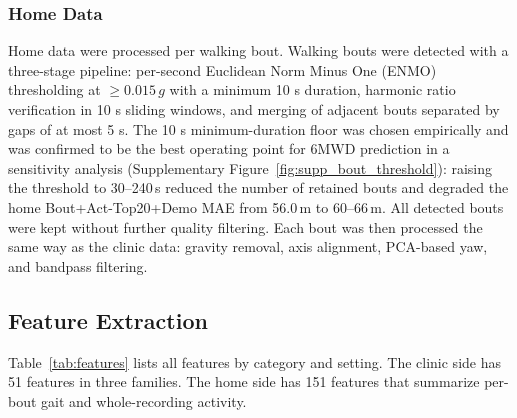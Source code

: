 \documentclass{article}
\begin{document}
\subsubsection{Home Data}
Home data were processed per walking bout. Walking bouts were detected with a three-stage pipeline: per-second Euclidean Norm Minus One (ENMO) thresholding at $\geq 0.015\,g$ with a minimum 10 s duration, harmonic ratio verification in 10 s sliding windows, and merging of adjacent bouts separated by gaps of at most 5 s. The 10 s minimum-duration floor was chosen empirically and was confirmed to be the best operating point for 6MWD prediction in a sensitivity analysis (Supplementary Figure~\ref{fig:supp_bout_threshold}): raising the threshold to 30--240\,s reduced the number of retained bouts and degraded the home Bout+Act-Top20+Demo MAE from 56.0\,m to 60--66\,m. All detected bouts were kept without further quality filtering. Each bout was then processed the same way as the clinic data: gravity removal, axis alignment, PCA-based yaw, and bandpass filtering.

\subsection{Feature Extraction}\label{sec:features}

Table~\ref{tab:features} lists all features by category and setting. The clinic side has 51 features in three families. The home side has 151 features that summarize per-bout gait and whole-recording activity.
\end{document}
